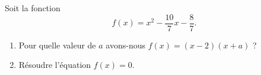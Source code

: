 
\begin{exercice}%
    \label{exosmath-0320}

    Soit la fonction
    \begin{equation}
        f(x)=x^2-\frac{ 10 }{ 7 }x-\frac{ 8 }{ 7 }.
    \end{equation}
    \begin{enumerate}
        \item
            Pour quelle valeur de \( a\) avons-nous \( f(x)=(x-2)(x+a)\) ?
        \item
            Résoudre l'équation \( f(x)=0\).
    \end{enumerate}

\end{exercice}
